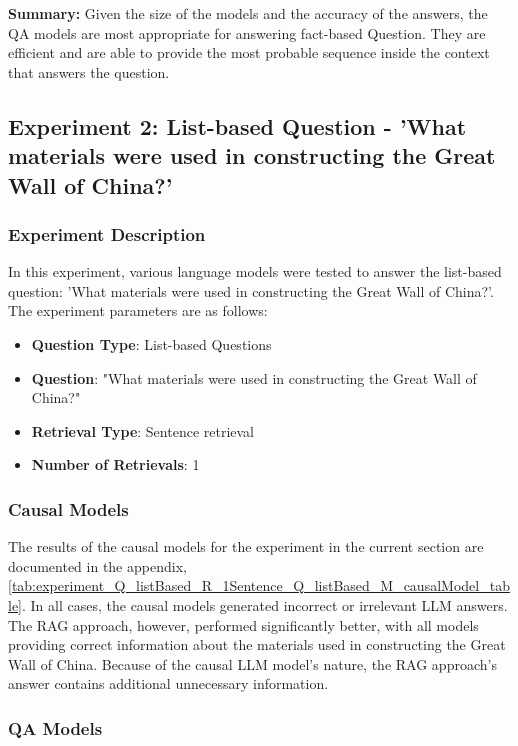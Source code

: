 \documentclass{wseas}
\begin{document}
\textbf{Summary:}
Given the size of the models and the accuracy of the answers, the QA models are most
appropriate for answering fact-based Question. They are efficient and are able to provide the most probable 
sequence inside the context that answers the question.

\subsection{Experiment 2: List-based Question - 'What materials were
used in constructing the Great Wall of China?'}

\subsubsection{Experiment Description}

In this experiment, various language models were tested to answer the
list-based question: 'What materials were used in constructing the
Great Wall of China?'. The experiment parameters are as follows:

\begin{itemize}
\item
  \textbf{Question Type}: List-based Questions
\item
  \textbf{Question}: "What materials were used in constructing the Great Wall of China?"
\item
  \textbf{Retrieval Type}: Sentence retrieval
\item
  \textbf{Number of Retrievals}: 1
\end{itemize}

\subsubsection{Causal Models}

The results of the causal models for the experiment in the current section are 
documented in the appendix, \autoref{tab:experiment_Q_listBased_R_1Sentence_Q_listBased_M_causalModel_table}. 
In all cases, the causal models generated incorrect or irrelevant LLM answers. 
The RAG approach, however, performed significantly better, with all models providing correct 
information about the materials used in constructing the Great Wall of China.
Because of the causal LLM model's nature, the RAG approach's answer contains additional unnecessary information.

\subsubsection{QA Models}
\end{document}
